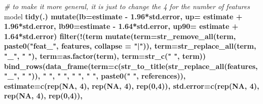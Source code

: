 \documentclass[12pt,]{article}
\newenvironment{Shaded}{\begin{snugshade}}{\end{snugshade}}
\newcommand{\CommentTok}[1]{\textcolor[rgb]{0.56,0.35,0.01}{\textit{#1}}}
\newcommand{\DataTypeTok}[1]{\textcolor[rgb]{0.13,0.29,0.53}{#1}}
\newcommand{\DecValTok}[1]{\textcolor[rgb]{0.00,0.00,0.81}{#1}}
\newcommand{\FloatTok}[1]{\textcolor[rgb]{0.00,0.00,0.81}{#1}}
\newcommand{\KeywordTok}[1]{\textcolor[rgb]{0.13,0.29,0.53}{\textbf{#1}}}
\newcommand{\NormalTok}[1]{#1}
\newcommand{\OperatorTok}[1]{\textcolor[rgb]{0.81,0.36,0.00}{\textbf{#1}}}
\newcommand{\OtherTok}[1]{\textcolor[rgb]{0.56,0.35,0.01}{#1}}
\newcommand{\StringTok}[1]{\textcolor[rgb]{0.31,0.60,0.02}{#1}}
\begin{document}
\begin{Shaded}
\begin{Highlighting}[]
  \CommentTok{# to make it more general, it is just to change the  4 for the number of features}
\NormalTok{  model }\OperatorTok{%
\StringTok{    }\KeywordTok{tidy}\NormalTok{(.) }\OperatorTok{%
\StringTok{    }\KeywordTok{mutate}\NormalTok{(}\DataTypeTok{lb=}\NormalTok{estimate }\OperatorTok{-}\StringTok{ }\FloatTok{1.96}\OperatorTok{*}\NormalTok{std.error, }
           \DataTypeTok{up=}\NormalTok{ estimate }\OperatorTok{+}\StringTok{ }\FloatTok{1.96}\OperatorTok{*}\NormalTok{std.error, }
           \DataTypeTok{lb90=}\NormalTok{estimate }\OperatorTok{-}\StringTok{ }\FloatTok{1.64}\OperatorTok{*}\NormalTok{std.error, }
           \DataTypeTok{up90=}\NormalTok{ estimate }\OperatorTok{+}\StringTok{ }\FloatTok{1.64}\OperatorTok{*}\NormalTok{std.error) }\OperatorTok{%
\StringTok{    }\KeywordTok{filter}\NormalTok{(}\OperatorTok{!}\NormalTok{(term }\OperatorTok{%
\StringTok{    }\KeywordTok{mutate}\NormalTok{(}\DataTypeTok{term=}\KeywordTok{str_remove_all}\NormalTok{(term, }\KeywordTok{paste0}\NormalTok{(}\StringTok{"feat_"}\NormalTok{, features, }\DataTypeTok{collapse =} \StringTok{"|"}\NormalTok{)),}
           \DataTypeTok{term=}\KeywordTok{str_replace_all}\NormalTok{(term, }\StringTok{"_"}\NormalTok{, }\StringTok{" "}\NormalTok{),}
           \DataTypeTok{term=}\KeywordTok{as.factor}\NormalTok{(term), }
           \DataTypeTok{term=}\KeywordTok{str_c}\NormalTok{(}\StringTok{"    "}\NormalTok{, term)) }\OperatorTok{%
\StringTok{    }\KeywordTok{bind_rows}\NormalTok{(}\KeywordTok{data_frame}\NormalTok{(}\DataTypeTok{term=}\KeywordTok{c}\NormalTok{(}\KeywordTok{str_to_title}\NormalTok{(}\KeywordTok{str_replace_all}\NormalTok{(features, }\StringTok{"_"}\NormalTok{, }\StringTok{" "}\NormalTok{)), }
                                \StringTok{" "}\NormalTok{, }\StringTok{"  "}\NormalTok{, }\StringTok{"   "}\NormalTok{, }\StringTok{"    "}\NormalTok{,}
                                \KeywordTok{paste0}\NormalTok{(}\StringTok{"    "}\NormalTok{, references)), }
                         \DataTypeTok{estimate=}\KeywordTok{c}\NormalTok{(}\KeywordTok{rep}\NormalTok{(}\OtherTok{NA}\NormalTok{, }\DecValTok{4}\NormalTok{), }\KeywordTok{rep}\NormalTok{(}\OtherTok{NA}\NormalTok{, }\DecValTok{4}\NormalTok{), }\KeywordTok{rep}\NormalTok{(}\DecValTok{0}\NormalTok{,}\DecValTok{4}\NormalTok{)),  }
                         \DataTypeTok{std.error=}\KeywordTok{c}\NormalTok{(}\KeywordTok{rep}\NormalTok{(}\OtherTok{NA}\NormalTok{, }\DecValTok{4}\NormalTok{), }\KeywordTok{rep}\NormalTok{(}\OtherTok{NA}\NormalTok{, }\DecValTok{4}\NormalTok{), }\KeywordTok{rep}\NormalTok{(}\DecValTok{0}\NormalTok{,}\DecValTok{4}\NormalTok{)),  }
}}}}}
\end{Highlighting}
\end{Shaded}
\end{document}
